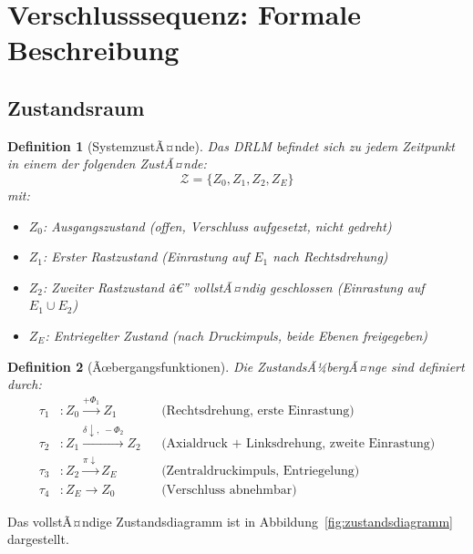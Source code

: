﻿\documentclass[12pt, a4paper]{article}
\newtheorem{definition}{Definition}[section]
\theoremstyle{remark}
\begin{document}
\section{Verschlusssequenz: Formale Beschreibung}

\subsection{Zustandsraum}

\begin{definition}[SystemzustÃ¤nde]
  Das DRLM befindet sich zu jedem Zeitpunkt in einem der folgenden ZustÃ¤nde:
  \[
    \mathcal{Z} = \{Z_0, Z_1, Z_2, Z_E\}
  \]
  mit:
  \begin{itemize}[noitemsep]
    \item $Z_0$: Ausgangszustand (offen, Verschluss aufgesetzt, nicht gedreht)
    \item $Z_1$: Erster Rastzustand (Einrastung auf $E_1$ nach Rechtsdrehung)
    \item $Z_2$: Zweiter Rastzustand â€” vollstÃ¤ndig geschlossen (Einrastung auf $E_1 \cup E_2$)
    \item $Z_E$: Entriegelter Zustand (nach Druckimpuls, beide Ebenen freigegeben)
  \end{itemize}
\end{definition}

\begin{definition}[Ãœbergangsfunktionen]
  Die ZustandsÃ¼bergÃ¤nge sind definiert durch:
  \begin{align}
    \tau_1 &: Z_0 \xrightarrow{+\Phi_1} Z_1 && \text{(Rechtsdrehung, erste Einrastung)}\\
    \tau_2 &: Z_1 \xrightarrow{\delta \downarrow,\; -\Phi_2} Z_2 && \text{(Axialdruck + Linksdrehung, zweite Einrastung)}\\
    \tau_3 &: Z_2 \xrightarrow{\pi \downarrow} Z_E && \text{(Zentraldruckimpuls, Entriegelung)}\\
    \tau_4 &: Z_E \xrightarrow{} Z_0 && \text{(Verschluss abnehmbar)}
  \end{align}
\end{definition}

Das vollstÃ¤ndige Zustandsdiagramm ist in Abbildung~\ref{fig:zustandsdiagramm} dargestellt.
\end{document}
